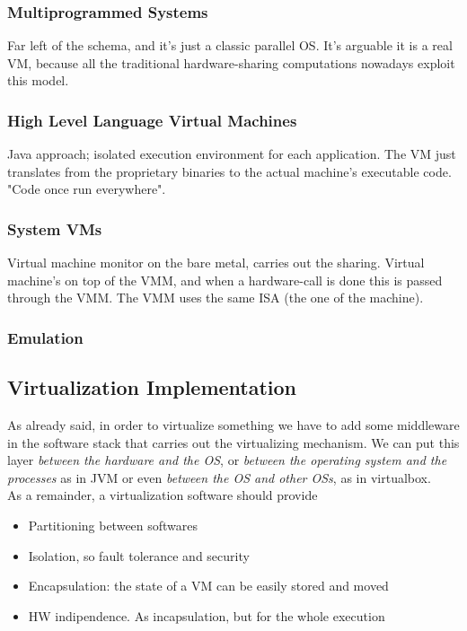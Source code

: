 \documentclass[10pt,a4paper]{article}
\begin{document}
				\subsubsection{Multiprogrammed Systems}
					Far left of the schema, and it's just a classic parallel OS. It's arguable it is a real VM, because all the traditional hardware-sharing computations nowadays exploit this model. 
					
				\subsubsection{High Level Language Virtual Machines}
					Java approach; isolated execution environment for each application. The VM just translates from the proprietary binaries to the actual machine's executable code. "Code once run everywhere".
					
				\subsubsection{System VMs}
					Virtual machine monitor on the bare metal, carries out the sharing. Virtual machine's on top of the VMM, and when a hardware-call is done this is passed through the VMM. The VMM uses the same ISA (the one of the machine).
				
				\subsubsection{Emulation}
				
			\subsection{Virtualization Implementation}
				As already said, in order to virtualize something we have to add some middleware in the software stack that carries out the virtualizing mechanism. We can put this layer \emph{between the hardware and the OS}, or \emph{between the operating system and the processes} as in JVM or even \emph{between the OS and other OSs}, as in virtualbox.\\
				As a remainder, a virtualization software should provide
				\begin{itemize}
					\item Partitioning between softwares
					\item Isolation, so fault tolerance and security
					\item Encapsulation: the state of a VM can be easily stored and moved
					\item HW indipendence. As incapsulation, but for the whole execution
				\end{itemize}
			
\end{document}
